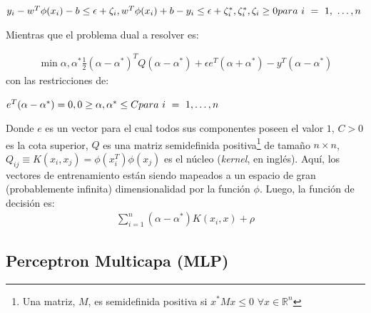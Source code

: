     \begin{math}
      y_{i} - w^{T} \phi(x_{i}) - b \leq \epsilon + \zeta_{i}, \\
      w^{T} \phi(x_{i}) + b - y_{i} \leq \epsilon + \zeta^{*}_{i}, \\
            \zeta^{*}_{i}, \zeta_{i} \geq 0 \\
      para\ i\ =\ 1,\ \dots, n
    \end{math}

    Mientras que el problema dual a resolver es:

    \begin{align}
      \min\limits{\alpha, \alpha^{*}} \frac{1}{2} (\alpha - \alpha^{*})^{T}
      Q(\alpha - \alpha^{*}) + \epsilon e^{T} (\alpha + \alpha^{*}) -
      y^{T} (\alpha - \alpha^{*})
    \end{align}
    con las restricciones de:

    \begin{math}
      e^{T} (\alpha - \alpha^{*}) = 0, \\
      0 \geq \alpha, \alpha^{*} \leq C \\
      para\ i\ =\ 1, \dots, n
    \end{math}

  \par Donde $e$ es un vector para el cual todos sus componentes poseen el valor $1$, $C > 0$
    es la cota superior, $Q$ es una matriz semidefinida
    positiva\footnote{Una matriz, $M$, es semidefinida positiva si $x^{*}Mx \leq 0$
    $\forall x \in \mathbb{R}^{n}$} de tamaño $n \times n$,
    $Q_{ij} \equiv K(x_{i}, x_{j}) = \phi(x_{i}^{T})\phi(x_{j})$ es el núcleo
    (\textit{kernel}, en inglés). Aquí, los vectores de entrenamiento están siendo mapeados
    a un espacio de gran (probablemente infinita) dimensionalidad por la función
    $\phi$.
    Luego, la función de decisión es:
    \begin{align}
      \sum_{i = 1}^{n} (\alpha - \alpha^{*})K(x_{i}, x) + \rho
    \end{align}

\subsection{Perceptron Multicapa (MLP)}

